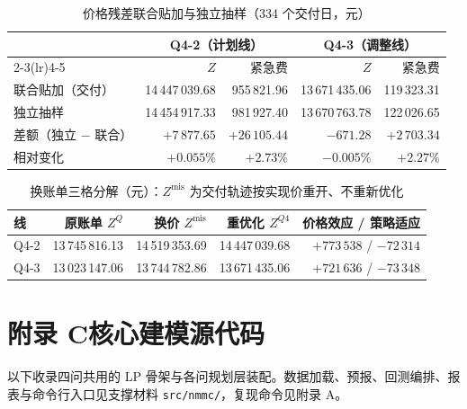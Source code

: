 \documentclass[12pt,a4paper]{ctexart}
\newcommand{\Zmis}{Z^{\mathrm{mis}}}
\begin{document}
\begin{table}[H]
\centering\small
\caption{价格残差联合贴加与独立抽样（334 个交付日，元）}
\begin{tabular}{lrrrr}
\toprule
 & \multicolumn{2}{c}{Q4-2（计划线）} & \multicolumn{2}{c}{Q4-3（调整线）} \\
\cmidrule(lr){2-3}\cmidrule(lr){4-5}
 & $Z$ & 紧急费 & $Z$ & 紧急费 \\
\midrule
联合贴加（交付） & 14\,447\,039.68 & 955\,821.96 & 13\,671\,435.06 & 119\,323.31 \\
独立抽样 & 14\,454\,917.33 & 981\,927.40 & 13\,670\,763.78 & 122\,026.65 \\
差额（独立 $-$ 联合） & $+7\,877.65$ & $+26\,105.44$ & $-671.28$ & $+2\,703.34$ \\
相对变化 & $+0.055\%$ & $+2.73\%$ & $-0.005\%$ & $+2.27\%$ \\
\bottomrule
\end{tabular}
\label{tab:aux_indep}
\end{table}

\begin{table}[H]
\centering\small
\caption{换账单三格分解（元）：$\Zmis$ 为交付轨迹按实现价重开、不重新优化}
\begin{tabular}{lrrrr}
\toprule
线 & 原账单 $Z^{Q}$ & 换价 $\Zmis$ & 重优化 $Z^{Q4}$ & 价格效应 / 策略适应 \\
\midrule
Q4-2 & 13\,745\,816.13 & 14\,519\,353.69 & 14\,447\,039.68 & $+773\,538$ / $-72\,314$ \\
Q4-3 & 13\,023\,147.06 & 13\,744\,782.86 & 13\,671\,435.06 & $+721\,636$ / $-73\,348$ \\
\bottomrule
\end{tabular}
\label{tab:q4mis}
\end{table}

\section*{附录 C\quad 核心建模源代码}
以下收录四问共用的 LP 骨架与各问规划层装配。数据加载、预报、回测编排、报表与命令行入口见支撑材料 \texttt{src/nmmc/}，复现命令见附录 A。






\end{document}
